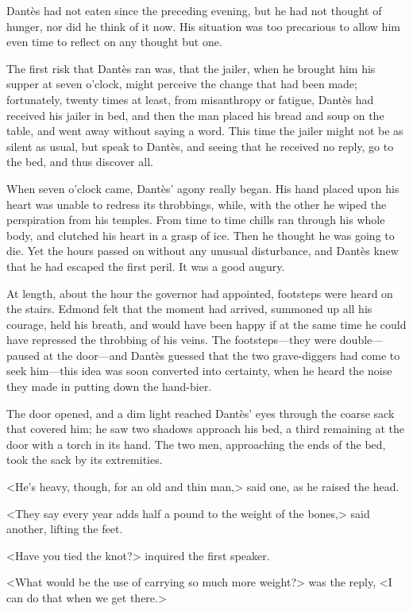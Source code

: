  Dantès had not eaten since the preceding evening, but he had not thought of hunger, nor did he think of it now. His situation was too precarious to allow him even time to reflect on any thought but one. 

 The first risk that Dantès ran was, that the jailer, when he brought him his supper at seven o'clock, might perceive the change that had been made; fortunately, twenty times at least, from misanthropy or fatigue, Dantès had received his jailer in bed, and then the man placed his bread and soup on the table, and went away without saying a word. This time the jailer might not be as silent as usual, but speak to Dantès, and seeing that he received no reply, go to the bed, and thus discover all. 

 When seven o'clock came, Dantès' agony really began. His hand placed upon his heart was unable to redress its throbbings, while, with the other he wiped the perspiration from his temples. From time to time chills ran through his whole body, and clutched his heart in a grasp of ice. Then he thought he was going to die. Yet the hours passed on without any unusual disturbance, and Dantès knew that he had escaped the first peril. It was a good augury. 

 At length, about the hour the governor had appointed, footsteps were heard on the stairs. Edmond felt that the moment had arrived, summoned up all his courage, held his breath, and would have been happy if at the same time he could have repressed the throbbing of his veins. The footsteps—they were double—paused at the door—and Dantès guessed that the two grave-diggers had come to seek him—this idea was soon converted into certainty, when he heard the noise they made in putting down the hand-bier. 

 The door opened, and a dim light reached Dantès' eyes through the coarse sack that covered him; he saw two shadows approach his bed, a third remaining at the door with a torch in its hand. The two men, approaching the ends of the bed, took the sack by its extremities. 

 <He's heavy, though, for an old and thin man,> said one, as he raised the head. 

 <They say every year adds half a pound to the weight of the bones,> said another, lifting the feet. 

 <Have you tied the knot?> inquired the first speaker. 

 <What would be the use of carrying so much more weight?> was the reply, <I can do that when we get there.> 

